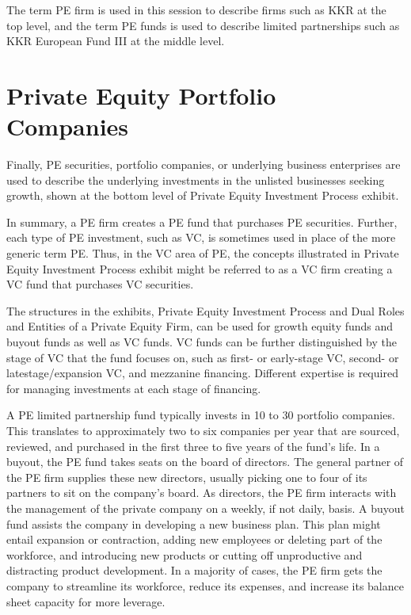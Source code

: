 \documentclass[11pt]{article}
\begin{document}
The term PE firm is used in this session to describe firms such as KKR at the top level, and the term PE funds is used to describe limited partnerships such as KKR European Fund III at the middle level.

\section*{Private Equity Portfolio Companies}
Finally, PE securities, portfolio companies, or underlying business enterprises are used to describe the underlying investments in the unlisted businesses seeking growth, shown at the bottom level of Private Equity Investment Process exhibit.

In summary, a PE firm creates a PE fund that purchases PE securities. Further, each type of PE investment, such as VC, is sometimes used in place of the more generic term PE. Thus, in the VC area of PE, the concepts illustrated in Private Equity Investment Process exhibit might be referred to as a VC firm creating a VC fund that purchases VC securities.

The structures in the exhibits, Private Equity Investment Process and Dual Roles and Entities of a Private Equity Firm, can be used for growth equity funds and buyout funds as well as VC funds. VC funds can be further distinguished by the stage of VC that the fund focuses on, such as first- or early-stage VC, second- or latestage/expansion VC, and mezzanine financing. Different expertise is required for managing investments at each stage of financing.

A PE limited partnership fund typically invests in 10 to 30 portfolio companies. This translates to approximately two to six companies per year that are sourced, reviewed, and purchased in the first three to five years of the fund's life. In a buyout, the PE fund takes seats on the board of directors. The general partner of the PE firm supplies these new directors, usually picking one to four of its partners to sit on the company's board. As directors, the PE firm interacts with the management of the private company on a weekly, if not daily, basis. A buyout fund assists the company in developing a new business plan. This plan might entail expansion or contraction, adding new employees or deleting part of the workforce, and introducing new products or cutting off unproductive and distracting product development. In a majority of cases, the PE firm gets the company to streamline its workforce, reduce its expenses, and increase its balance sheet capacity for more leverage.
\end{document}
